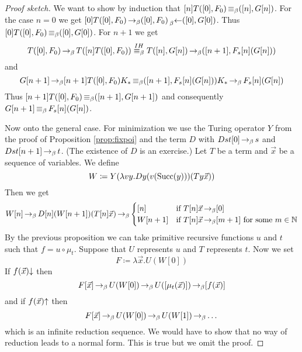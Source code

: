 \begin{proof}[Proof sketch]
We want to show by induction that $[n]T([0], F_0) \operatorname{\equiv_{\beta}} ([n], G[n])$.
For the case $n = 0$ we get $[0]T([0], F_0) \operatorname{\to_{\beta}} ([0], F_0) \prescript{}{\beta}{\leftarrow} ([0], G[0])$.
Thus $[0]T([0], F_0) \operatorname{\equiv_{\beta}} ([0], G[0])$.
For $n + 1$ we get
\begin{equation*}
    [n + 1]T([0], F_0) \bered T([n]T([0], F_0)) \stackrel{IH}{\beq} T([n], G[n]) \bered ([n + 1], F_s [n](G[n]))
\end{equation*}
and 
\begin{equation*}
    G[n + 1] \operatorname{\to_{\beta}} [n + 1]T([0], F_0)K_*  \operatorname{\equiv_{\beta}} ([n + 1], F_s [n](G[n]))K_* \operatorname{\to_{\beta}} F_s[n](G[n])
\end{equation*}
Thus $[n + 1]T([0], F_0) \operatorname{\equiv_{\beta}} ([n + 1], G[n + 1])$ and consequently $G[n + 1] \operatorname{\equiv_{\beta}} F_s [n](G[n])$.

\hfill

Now onto the general case.
For minimization we use the Turing operator $Y$ from the proof of Proposition \ref{prop:fixpoi} and the term $D$ with $Dst[0] \operatorname{\to_{\beta}} s$ and $Dst[n + 1] \operatorname{\to_{\beta}} t$.
(The existence of $D$ is an exercise.) 
Let $T$ be a term and $\vec{x}$ be a sequence of variables. 
We define 
\begin{equation*}
    W \coloneq Y (\lambda vy. Dy (v (\text{Succ}(y)))(Ty \vec{x}))
\end{equation*}
Then we get 
\begin{equation*}
    W[n] \operatorname{\to_{\beta}} D[n](W[n + 1])(T[n]\vec{x}) \operatorname{\to_{\beta}} 
    \begin{cases}
        [n] & \text{if } T[n]\vec{x} \operatorname{\to_{\beta}} [0] \\
        W[n + 1] & \text{if } T[n] \vec{x} \operatorname{\to_{\beta}} [m + 1] \text{ for some } m \in \mathbb{N}
    \end{cases}
\end{equation*}
By the previous proposition we can take primitive recursive functions $u$ and $t$ such that $f = u \circ \mu_t$. 
Suppose that $U$ represents $u$ and $T$ represents $t$.
Now we set 
\begin{equation*}
    F \coloneq \lambda \vec{x}. U (W[0])
\end{equation*}
If $f(\vec{x}){\downarrow}$ then 
\begin{equation*}
    F[\vec{x}] \operatorname{\to_{\beta}} U(W[0]) \operatorname{\to_{\beta}} U([\mu_t(\vec{x})]) \operatorname{\to_{\beta}} [f(\vec{x})]
\end{equation*}
and if $f(\vec{x}){\uparrow}$ then 
\begin{equation*}
    F[\vec{x}] \operatorname{\to_{\beta}} U(W[0]) \operatorname{\to_{\beta}} U(W[1]) \operatorname{\to_{\beta}} \dots
\end{equation*}
which is an infinite reduction sequence. 
We would have to show that no way of reduction leads to a normal form. 
This is true but we omit the proof.
\end{proof}


